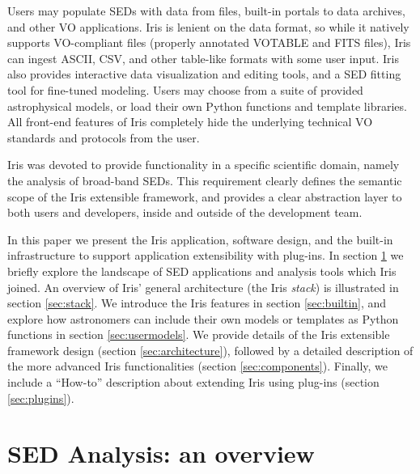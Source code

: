 \documentclass[5p]{elsarticle}
\begin{document}
Users may populate SEDs with data from files, built-in portals to data archives, and other VO applications. Iris is lenient on the data format, so while it natively supports VO-compliant files (properly annotated VOTABLE and FITS files), Iris can ingest ASCII, CSV, and other table-like formats with some user input. Iris also provides interactive data visualization and editing tools, and a SED fitting tool for fine-tuned modeling. Users may choose from a suite of provided astrophysical models, or load their own Python functions and template libraries. All front-end features of Iris completely hide the underlying technical VO standards and protocols from the user.

Iris was devoted to provide functionality in a specific scientific domain, namely the analysis of broad-band SEDs. This requirement clearly defines the semantic scope of the  Iris extensible framework, and provides a clear abstraction layer to both users and developers, inside and outside of the development team.

In this paper we present the Iris application, software design, and the built-in infrastructure to support application extensibility with plug-ins. In section \ref{sec:overview} we briefly explore the landscape of SED applications and analysis tools which Iris joined. An overview of Iris' general architecture (the Iris \emph{stack}) is illustrated in section \ref{sec:stack}. We introduce the Iris features in section \ref{sec:builtin}, and explore how astronomers can include their own models or templates as Python functions in section \ref{sec:usermodels}. We provide details of the Iris extensible framework design (section \ref{sec:architecture}), followed by a detailed description of the more advanced Iris functionalities (section \ref{sec:components}). Finally, we include a ``How-to'' description about extending Iris using plug-ins (section \ref{sec:plugins}).

\section{SED Analysis: an overview}
\label{sec:overview}
\end{document}
